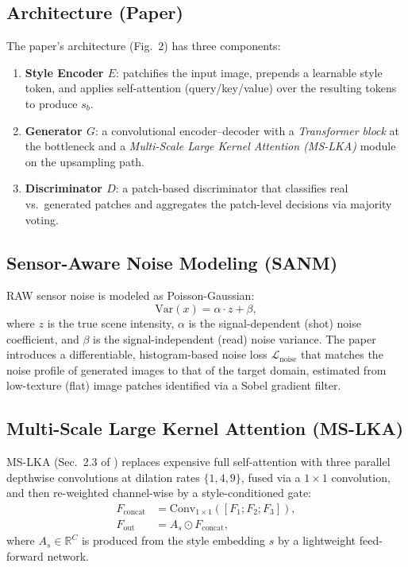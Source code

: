\documentclass[11pt]{article}
\begin{document}
\subsection{Architecture (Paper)}
The paper's architecture (Fig.~2) has three components:
\begin{enumerate}[nosep]
    \item \textbf{Style Encoder $E$}: patchifies the input image, prepends
          a learnable style token, and applies self-attention
          (query/key/value) over the resulting tokens to produce $s_b$.
    \item \textbf{Generator $G$}: a convolutional encoder--decoder with a
          \emph{Transformer block} at the bottleneck and a
          \emph{Multi-Scale Large Kernel Attention (MS-LKA)} module on
          the upsampling path.
    \item \textbf{Discriminator $D$}: a patch-based discriminator that
          classifies real vs.\ generated patches and aggregates the
          patch-level decisions via majority voting.
\end{enumerate}

\subsection{Sensor-Aware Noise Modeling (SANM)}
RAW sensor noise is modeled as Poisson-Gaussian:
\begin{equation}
    \mathrm{Var}(x) = \alpha \cdot z + \beta,
\end{equation}
where $z$ is the true scene intensity, $\alpha$ is the signal-dependent
(shot) noise coefficient, and $\beta$ is the signal-independent (read)
noise variance. The paper introduces a differentiable, histogram-based
noise loss $\mathcal{L}_{\text{noise}}$ that matches the noise profile of
generated images to that of the target domain, estimated from
low-texture (flat) image patches identified via a Sobel gradient filter.

\subsection{Multi-Scale Large Kernel Attention (MS-LKA)}
MS-LKA (Sec.~2.3 of \cite{merit2026}) replaces expensive full
self-attention with three parallel depthwise convolutions at dilation
rates $\{1, 4, 9\}$, fused via a $1\times1$ convolution, and then
re-weighted channel-wise by a style-conditioned gate:
\begin{align}
    F_{\text{concat}} &= \mathrm{Conv}_{1\times1}([F_1; F_2; F_3]), \\
    F_{\text{out}} &= A_s \odot F_{\text{concat}},
\end{align}
where $A_s \in \mathbb{R}^C$ is produced from the style embedding $s$ by
a lightweight feed-forward network.
\end{document}
